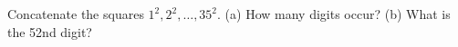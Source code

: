 Concatenate the squares $1^2,2^2,\ldots,35^2$. (a) How many digits occur? (b) What is the 52nd digit?
